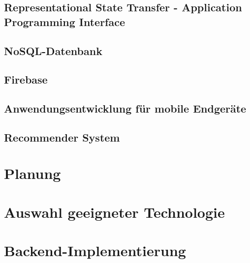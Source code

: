 \documentclass[11pt,a4paper]{article}
\begin{document}
\subsection{Representational State Transfer - Application Programming Interface}

\newpage
\subsection{NoSQL-Datenbank}

\newpage
\subsection{Firebase}
\label{sec:firebase}


\newpage
\subsection{Anwendungsentwicklung für mobile Endgeräte}


%
\newpage

\subsection{Recommender System}
\label{sec:recomandationSystem}



\clearpage
\section{Planung}



\clearpage
\section{Auswahl geeigneter Technologie}



\clearpage
\section{Backend-Implementierung}

\end{document}

